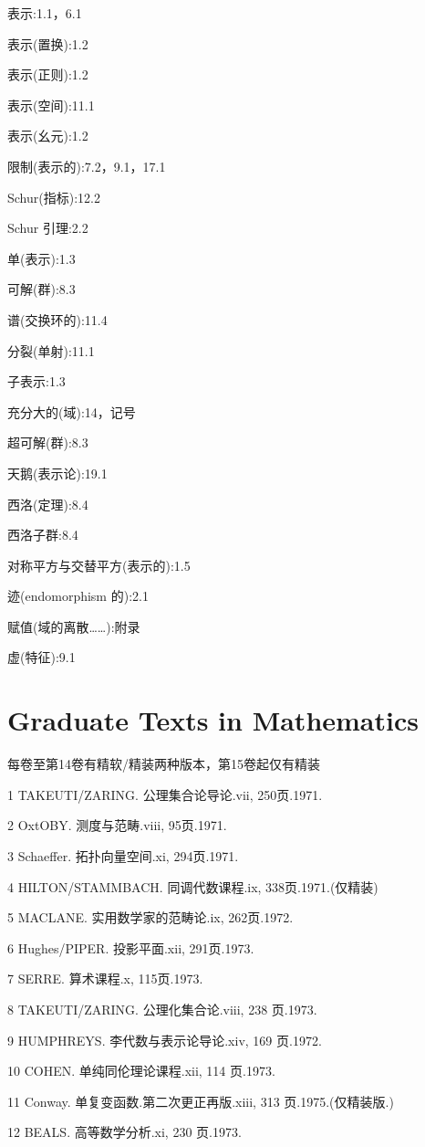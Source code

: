 \documentclass[10pt]{article}
\begin{document}
表示:1.1，6.1

表示(置换):1.2

表示(正则):1.2

表示(空间):11.1

表示(幺元):1.2

限制(表示的):7.2，9.1，17.1

Schur(指标):12.2

Schur 引理:2.2

单(表示):1.3

可解(群):8.3

谱(交换环的):11.4

分裂(单射):11.1

子表示:1.3

充分大的(域):14，记号

超可解(群):8.3

天鹅(表示论):19.1

西洛(定理):8.4

西洛子群:8.4

对称平方与交替平方(表示的):1.5

迹(endomorphism 的):2.1

赋值(域的离散……):附录

虚(特征):9.1

\section*{Graduate Texts in Mathematics}

每卷至第14卷有精软/精装两种版本，第15卷起仅有精装

1 TAKEUTI/ZARING. 公理集合论导论.vii, 250页.1971.

2 OxtOBY. 测度与范畴.viii, 95页.1971.

3 Schaeffer. 拓扑向量空间.xi, 294页.1971.

4 HILTON/STAMMBACH. 同调代数课程.ix, 338页.1971.(仅精装)

5 MACLANE. 实用数学家的范畴论.ix, 262页.1972.

6 Hughes/PIPER. 投影平面.xii, 291页.1973.

7 SERRE. 算术课程.x, 115页.1973.

8 TAKEUTI/ZARING. 公理化集合论.viii, 238 页.1973.

9 HUMPHREYS. 李代数与表示论导论.xiv, 169 页.1972.

10 COHEN. 单纯同伦理论课程.xii, 114 页.1973.

11 Conway. 单复变函数.第二次更正再版.xiii, 313 页.1975.(仅精装版.)

12 BEALS. 高等数学分析.xi, 230 页.1973.
\end{document}
